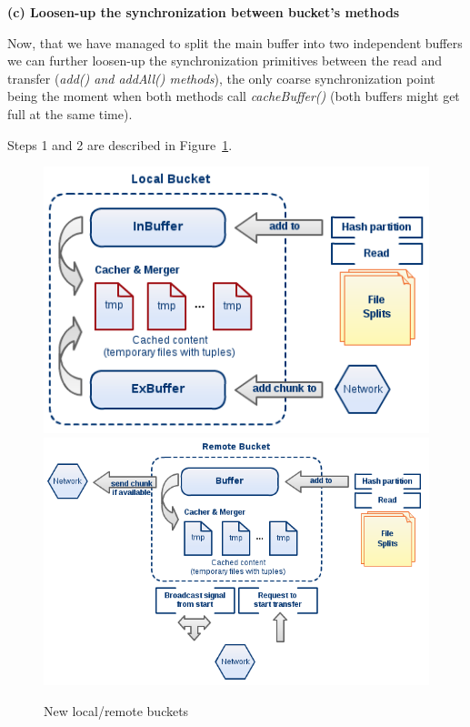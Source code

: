\textbf{(c) Loosen-up the synchronization between bucket's methods}

Now, that we have managed to split the main buffer into two independent buffers we can further loosen-up the synchronization primitives between the read and transfer (\textit{add() and addAll() methods}), the only coarse synchronization point being the moment when both methods call \textit{cacheBuffer()} (both buffers might get full at the same time).

Steps 1 and 2 are described in Figure~\ref{fig:diag4}.

\pagebreak

\begin{figure}
\centering
\includegraphics[scale=0.6]{diag4a}
\linebreak
\linebreak
\centering
\includegraphics[scale=0.6]{diag4b}
\caption{New local/remote buckets}
\label{fig:diag4}
\end{figure}

